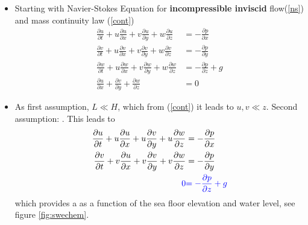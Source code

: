 \begin{frame}
\vspace{-3mm}
\begin{itemize}
\item<2-> Starting with Navier-Stokes Equation for \textbf{incompressible inviscid} flow(\ref{ns}) and mass continuity law (\ref{cont})
\begin{align}
\frac{\partial u}{\partial t} + u\frac{\partial u}{\partial x} + v\frac{\partial u}{\partial y} + w\frac{\partial u}{\partial z} &= - \frac{\partial p}{\partial x} \nonumber \\ 
\frac{\partial v}{\partial t} + u\frac{\partial v}{\partial x} + v\frac{\partial v}{\partial y} + w\frac{\partial v}{\partial z}&= - \frac{\partial p}{\partial y} \label{ns} \\ 
\frac{\partial w}{\partial t} + u\frac{\partial w}{\partial x} + v\frac{\partial w}{\partial y} + w\frac{\partial w}{\partial z} &= - \frac{\partial p}{\partial z} + g \nonumber\\[0.3cm]
\frac{\partial u}{\partial x} + \frac{\partial v}{\partial y} + \frac{\partial w}{\partial z} &= 0 \label{cont}
\end{align}

\item<3-> As first assumption, $L \ll H$, which from (\ref{cont}) it leads to $u,v\ll z$. Second assumption: . This leads to
\begin{align}
\frac{\partial u}{\partial t} + u\frac{\partial u}{\partial x} + u\frac{\partial v}{\partial y} + u\frac{\partial w}{\partial z} &= - \frac{\partial p}{\partial x} \nonumber \nonumber \\ 
\frac{\partial v}{\partial t} + v\frac{\partial u}{\partial x} + v\frac{\partial v}{\partial y} + v\frac{\partial w}{\partial z}&= - \frac{\partial p}{\partial y} \nonumber \\ 
\textcolor{blue}{0} &\textcolor{blue}{ = - \frac{\partial p}{\partial z} + g} \label{press}
\end{align}
which provides a  as a function of the sea floor elevation and water level, see figure \ref{fig:swechem}.
\end{itemize}
\end{frame}
\clearpage


